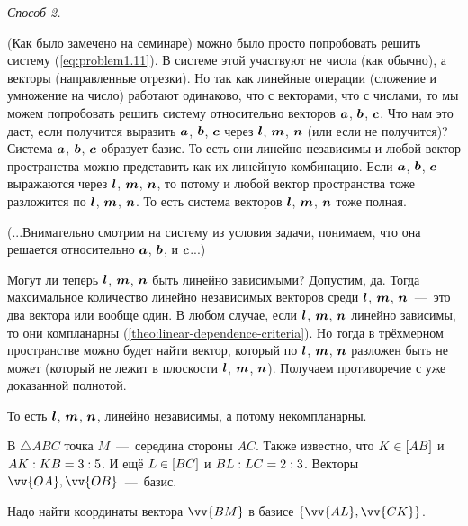 \documentclass[a4paper,12pt]{article}
\begin{document}
\begin{solution}
    \bigskip
    
    \emph{Способ 2.}
    
    \medskip
    
    (Как было замечено на семинаре) можно было просто попробовать решить систему (\ref{eq:problem1.11}).
    В системе этой участвуют не числа (как обычно), а векторы (направленные отрезки).
    Но так как линейные операции (сложение и умножение на число) работают одинаково, что с векторами, что с числами, то мы можем попробовать решить систему относительно векторов $\boldsymbol a$, $\boldsymbol b$, $\boldsymbol c$.
    Что нам это даст, если получится выразить $\boldsymbol a$, $\boldsymbol b$, $\boldsymbol c$ через $\boldsymbol l$, $\boldsymbol m$, $\boldsymbol n$ (или если не получится)?
    Система $\boldsymbol a$, $\boldsymbol b$, $\boldsymbol c$ образует базис.
    То есть они линейно независимы и любой вектор пространства можно представить как их линейную комбинацию.
    Если $\boldsymbol a$, $\boldsymbol b$, $\boldsymbol c$ выражаются через $\boldsymbol l$, $\boldsymbol m$, $\boldsymbol n$, то потому и любой вектор пространства тоже разложится по $\boldsymbol l$, $\boldsymbol m$, $\boldsymbol n$.
    То есть система векторов $\boldsymbol l$, $\boldsymbol m$, $\boldsymbol n$ тоже полная.
    
    (...Внимательно смотрим на систему из условия задачи, понимаем, что она решается относительно $\boldsymbol a$, $\boldsymbol b$, и $\boldsymbol c$...)
    
    Могут ли теперь $\boldsymbol l$, $\boldsymbol m$, $\boldsymbol n$ быть линейно зависимыми?
    Допустим, да.
    Тогда максимальное количество линейно независимых векторов среди $\boldsymbol l$, $\boldsymbol m$, $\boldsymbol n$~---~это два вектора или вообще один.
    В любом случае, если $\boldsymbol l$, $\boldsymbol m$, $\boldsymbol n$ линейно зависимы, то они компланарны (\ref{theo:linear-dependence-criteria}).
    Но тогда в трёхмерном пространстве можно будет найти вектор, который по $\boldsymbol l$, $\boldsymbol m$, $\boldsymbol n$ разложен быть не может (который не лежит в плоскости $\boldsymbol l$, $\boldsymbol m$, $\boldsymbol n$).
    Получаем противоречие с уже доказанной полнотой.
    
    То есть $\boldsymbol l$, $\boldsymbol m$, $\boldsymbol n$, линейно независимы, а потому некомпланарны.
  \end{solution}
  
  
  \begin{problem}[1.21]
    В $\triangle ABC$ точка $M$~---~середина стороны $AC$.
    Также известно, что $K \hm\in [AB]$ и $AK \hm: KB \hm= 3 \hm: 5$.
    И ещё $L \hm\in [BC]$ и $BL \hm: LC \hm= 2 \hm: 3$.
    Векторы $\vv{OA}, \vv{OB}$~---~базис.
    
    Надо найти координаты вектора $\vv{BM}$ в базисе $\{\vv{AL}, \vv{CK}\}$.
  \end{problem}
  
\end{document}
